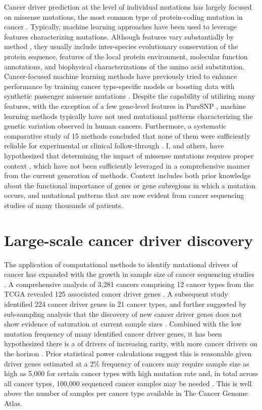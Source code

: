 Cancer driver prediction at the level of individual mutations has largely focused on missense mutations, the most common type of protein-coding mutation in cancer \cite{RN25}. Typically, machine learning approaches have been used to leverage features characterizing mutations. Although features vary substantially by method \cite{RN32, RN33, RN35, RN36, RN39, RN29, RN37}, they usually include inter-species evolutionary conservation of the protein sequence, features of the local protein environment, molecular function annotations, and biophysical characterizations of the amino acid substitution. Cancer-focused machine learning methods have previously tried to enhance performance by training cancer type-specific models \cite{RN10, RN12} or boosting data with synthetic passenger missense mutations \cite{RN10}. Despite the capability of utilizing many features, with the exception of a few gene-level features in ParsSNP \cite{RN9}, machine learning methods typically have not used mutational patterns characterizing the genetic variation observed in human cancers. Furthermore, a systematic comparative study of 15 methods concluded that none of them were sufficiently reliable for experimental or clinical follow-through \cite{RN46}. I, and others, have hypothesized that determining the impact of missense mutations requires proper context \cite{RN47, RN57}, which have not been sufficiently leveraged in a comprehensive manner from the current generation of methods. Context includes both prior knowledge about the functional importance of genes or gene subregions in which a mutation occurs, and mutational patterns that are now evident from cancer sequencing studies of many thousands of patients.

\section{Large-scale cancer driver discovery}
\label{sec:section}

The application of computational methods to identify mutational drivers of cancer has expanded with the growth in sample size of cancer sequencing studies \cite{RN99, RN105, RN14, RN87, RN158, RN12, RN13, RN54, RN96, RN98, RN154, RN43}. A comprehensive analysis of 3,281 cancers comprising 12 cancer types from the TCGA revealed 125 associated cancer driver genes \cite{RN12}.  A subsequent study identified 224 cancer driver genes in 21 cancer types, and further suggested by sub-sampling analysis that the discovery of new cancer driver genes does not show evidence of saturation at current sample sizes \cite{RN14}. Combined with the low mutation frequency of many identified cancer driver genes, it has been hypothesized there is a  of drivers of increasing rarity, with more cancer drivers on the horizon \cite{RN148, RN147}. Prior statistical power calculations suggest this is reasonable given driver genes estimated at a 2\% frequency of cancers may require sample size as high as 5,000 for certain cancer types with high mutation rate and, in total across all cancer types, 100,000 sequenced cancer samples may be needed \cite{RN14}. This is well above the number of samples per cancer type available in The Cancer Genome Atlas. 

